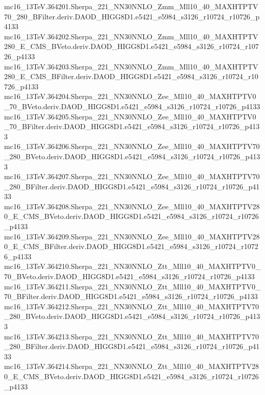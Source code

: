 \begin{footnotesize}
mc16\_13TeV.364201.Sherpa\_221\_NN30NNLO\_Zmm\_Mll10\_40\_MAXHTPTV70\_280\_BFilter.deriv.DAOD\_HIGG8D1.e5421\_e5984\_s3126\_r10724\_r10726\_p4133 \\
mc16\_13TeV.364202.Sherpa\_221\_NN30NNLO\_Zmm\_Mll10\_40\_MAXHTPTV280\_E\_CMS\_BVeto.deriv.DAOD\_HIGG8D1.e5421\_e5984\_s3126\_r10724\_r10726\_p4133 \\
mc16\_13TeV.364203.Sherpa\_221\_NN30NNLO\_Zmm\_Mll10\_40\_MAXHTPTV280\_E\_CMS\_BFilter.deriv.DAOD\_HIGG8D1.e5421\_e5984\_s3126\_r10724\_r10726\_p4133 \\
mc16\_13TeV.364204.Sherpa\_221\_NN30NNLO\_Zee\_Mll10\_40\_MAXHTPTV0\_70\_BVeto.deriv.DAOD\_HIGG8D1.e5421\_e5984\_s3126\_r10724\_r10726\_p4133 \\
mc16\_13TeV.364205.Sherpa\_221\_NN30NNLO\_Zee\_Mll10\_40\_MAXHTPTV0\_70\_BFilter.deriv.DAOD\_HIGG8D1.e5421\_e5984\_s3126\_r10724\_r10726\_p4133 \\
mc16\_13TeV.364206.Sherpa\_221\_NN30NNLO\_Zee\_Mll10\_40\_MAXHTPTV70\_280\_BVeto.deriv.DAOD\_HIGG8D1.e5421\_e5984\_s3126\_r10724\_r10726\_p4133 \\
mc16\_13TeV.364207.Sherpa\_221\_NN30NNLO\_Zee\_Mll10\_40\_MAXHTPTV70\_280\_BFilter.deriv.DAOD\_HIGG8D1.e5421\_e5984\_s3126\_r10724\_r10726\_p4133 \\
mc16\_13TeV.364208.Sherpa\_221\_NN30NNLO\_Zee\_Mll10\_40\_MAXHTPTV280\_E\_CMS\_BVeto.deriv.DAOD\_HIGG8D1.e5421\_e5984\_s3126\_r10724\_r10726\_p4133 \\
mc16\_13TeV.364209.Sherpa\_221\_NN30NNLO\_Zee\_Mll10\_40\_MAXHTPTV280\_E\_CMS\_BFilter.deriv.DAOD\_HIGG8D1.e5421\_e5984\_s3126\_r10724\_r10726\_p4133 \\
mc16\_13TeV.364210.Sherpa\_221\_NN30NNLO\_Ztt\_Mll10\_40\_MAXHTPTV0\_70\_BVeto.deriv.DAOD\_HIGG8D1.e5421\_e5984\_s3126\_r10724\_r10726\_p4133 \\
mc16\_13TeV.364211.Sherpa\_221\_NN30NNLO\_Ztt\_Mll10\_40\_MAXHTPTV0\_70\_BFilter.deriv.DAOD\_HIGG8D1.e5421\_e5984\_s3126\_r10724\_r10726\_p4133 \\
mc16\_13TeV.364212.Sherpa\_221\_NN30NNLO\_Ztt\_Mll10\_40\_MAXHTPTV70\_280\_BVeto.deriv.DAOD\_HIGG8D1.e5421\_e5984\_s3126\_r10724\_r10726\_p4133 \\
mc16\_13TeV.364213.Sherpa\_221\_NN30NNLO\_Ztt\_Mll10\_40\_MAXHTPTV70\_280\_BFilter.deriv.DAOD\_HIGG8D1.e5421\_e5984\_s3126\_r10724\_r10726\_p4133 \\
mc16\_13TeV.364214.Sherpa\_221\_NN30NNLO\_Ztt\_Mll10\_40\_MAXHTPTV280\_E\_CMS\_BVeto.deriv.DAOD\_HIGG8D1.e5421\_e5984\_s3126\_r10724\_r10726\_p4133 \\

\end{footnotesize}
